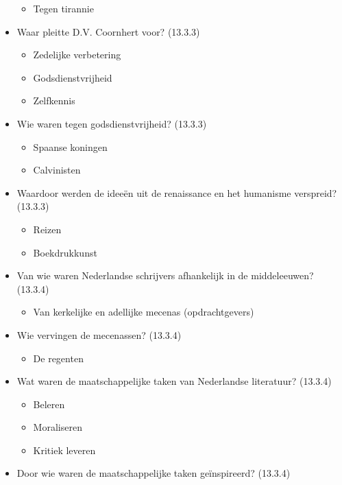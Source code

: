 \begin{itemize}
  \begin{itemize}
  \itemsep1pt\parskip0pt
  \item
    Tegen tirannie
  \end{itemize}
\item
  Waar pleitte D.V. Coornhert voor? (13.3.3)

  \begin{itemize}
  \itemsep1pt\parskip0pt
  \item
    Zedelijke verbetering
  \item
    Godsdienstvrijheid
  \item
    Zelfkennis
  \end{itemize}
\item
  Wie waren tegen godsdienstvrijheid? (13.3.3)

  \begin{itemize}
  \itemsep1pt\parskip0pt
  \item
    Spaanse koningen
  \item
    Calvinisten
  \end{itemize}
\item
  Waardoor werden de ideeën uit de renaissance en het humanisme
  verspreid? (13.3.3)

  \begin{itemize}
  \itemsep1pt\parskip0pt
  \item
    Reizen
  \item
    Boekdrukkunst
  \end{itemize}
\item
  Van wie waren Nederlandse schrijvers afhankelijk in de middeleeuwen?
  (13.3.4)

  \begin{itemize}
  \itemsep1pt\parskip0pt
  \item
    Van kerkelijke en adellijke mecenas (opdrachtgevers)
  \end{itemize}
\item
  Wie vervingen de mecenassen? (13.3.4)

  \begin{itemize}
  \itemsep1pt\parskip0pt
  \item
    De regenten
  \end{itemize}
\item
  Wat waren de maatschappelijke taken van Nederlandse literatuur?
  (13.3.4)

  \begin{itemize}
  \itemsep1pt\parskip0pt
  \item
    Beleren
  \item
    Moraliseren
  \item
    Kritiek leveren
  \end{itemize}
\item
  Door wie waren de maatschappelijke taken geïnspireerd? (13.3.4)


\end{itemize}
